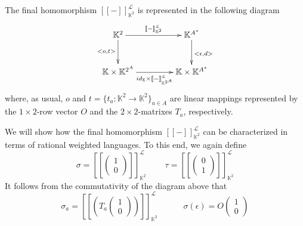 \documentclass[3p]{elsarticle}
\newcommand{\fL}{\mathcal{L}}    %
\newcommand{\emp}{\epsilon}           %
\newcommand{\der}{d}           %
\newcommand{\vectproduct}{\times} %
\newcommand{\beh}[3]{\left[\!\left[ #1 \right]\!\right]^{#2}_{#3}} %
\newcommand{\K}{\mathbb{K}}            %
\begin{document}
\bigskip
\noindent
The final homomorphism $\beh{-}{\fL}{\K^2}$ is represented in the following diagram
\[
\xymatrix@+1.0ex@C+3.6ex{ \K^2 \dto_-{ <o,t>}  \ar[r]^-{\beh{-}{\fL}{\K^2}} & \K^{A^*}
\dto^{<\emp,\der>}
\\
\K \vectproduct \K^{2^A} \rto_-{ id_{\K} \vectproduct
\beh{-}{\fL}{\K^{2^A} }} & \K \vectproduct \K^{A^*} }
\]
where, as usual, $o$ and $t=\{t_a: \K^2 \to \K^2\}_{a\in A}$ are linear mappings
represented by the $1\times 2$-row vector $O$ and the $2 \times 2$-matrixes $T_a$, respectively.

We will show how the final homomorphism $\beh{-}{\fL}{\K^2}$ can be
characterized in terms of rational weighted languages. To this end, we again
define
\[
\sigma = \beh{\left(%
\begin{array}{c}
  1 \\
  0
\end{array}\right)}{\fL}{\K^2} \;\;\;\;\;\;\;\; \tau = \beh{\left(%
\begin{array}{c}
  0 \\
  1
\end{array}\right)}{\fL}{\K^2}
\]
%
It follows from the commutativity of the diagram above that
\[
\sigma_a=\beh{(T_a
%
\left(%
\begin{array}{c}
  1 \\
  0
\end{array}\right))}{\fL}{\K^2}
\;\;\;\;\;\;\;\;\;\;\; \sigma(\epsilon)=O \left(%
\begin{array}{c}
  1 \\
  0
\end{array}\right)
\]
\end{document}

